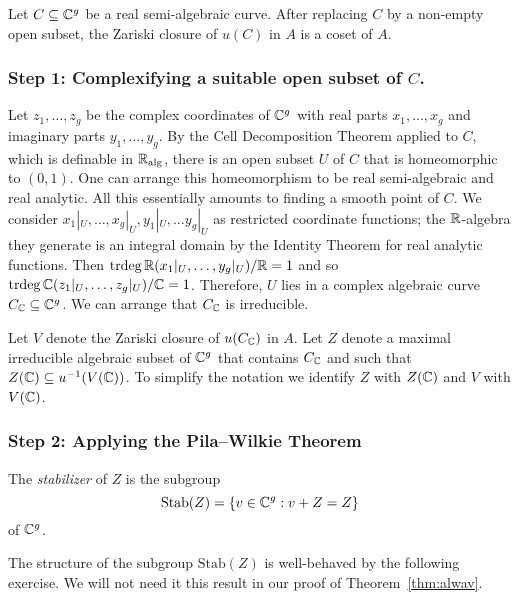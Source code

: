 \begin{theorem}
  \label{thm:alwav}
  Let $C\subseteq{\mathbb{C}}^g$ be a real semi-algebraic curve. After replacing
  $C$ by a non-empty open subset, the Zariski
  closure of $u(C)$ in $A$ is a coset of $A$.
\end{theorem}

\subsubsection{Step 1: Complexifying a suitable open subset of $C$.}

Let $z_1,\ldots,z_g$ be the complex coordinates of ${\mathbb{C}}^g$ with real
parts $x_1,\ldots,x_g$ and imaginary parts $y_1,\ldots,y_g$. By the
Cell Decomposition Theorem applied to $C$, which is definable in
${\mathbb{R}}_{\mathrm{alg}}$, there is an open subset $U$ of $C$ that is homeomorphic to
$(0,1)$. One can arrange this homeomorphism to be real semi-algebraic
and real analytic. All this essentially amounts to finding a smooth
point of $C$. We consider $x_1|_{U},\ldots,{x_g}|_U,{y_1}|_U,\ldots
y_g|_{U}$ as restricted coordinate functions; the ${\mathbb{R}}$-algebra they
generate is an integral domain by the Identity Theorem for real
analytic functions. Then
$\mathrm{trdeg}\,{\mathbb{R}}({x_1}|_U,\ldots,{y_g}|_U)/{\mathbb{R}}=1$ and so
$\mathrm{trdeg}\,{\mathbb{C}}({z_1}|_U,\ldots,{z_g}|_U)/{\mathbb{C}}=1$. Therefore, $U$
lies in a complex algebraic curve $C_{{\mathbb{C}}}\subseteq{\mathbb{C}}^g$. We can
arrange that $C_{\mathbb{C}}$ is irreducible.

Let $V$ denote the Zariski closure of $u(C_{\mathbb{C}})$ in $A$. Let $Z$
denote a maximal irreducible algebraic subset of ${\mathbb{C}}^g$ that contains $C_{{\mathbb{C}}}$
and such that $Z({\mathbb{C}})\subseteq u^{-1}(V({\mathbb{C}}))$. To
simplify the notation we identify $Z$ with $Z({\mathbb{C}})$ and $V$ with
$V({\mathbb{C}})$.


\subsubsection{Step 2: Applying the Pila--Wilkie Theorem}

\begin{definition}
  \label{def:stabZ}
  The \emph{stabilizer} of $Z$ is the subgroup
  \begin{equation*}
    \mathrm{Stab}(Z) = \{v\in {\mathbb{C}}^g : v+Z=Z\}
  \end{equation*}
  of ${\mathbb{C}}^g$. 
\end{definition}

The structure of the subgroup $\mathrm{Stab}(Z)$ is well-behaved by
the following exercise. We will not need it this result in our proof
of Theorem~\ref{thm:alwav}.

